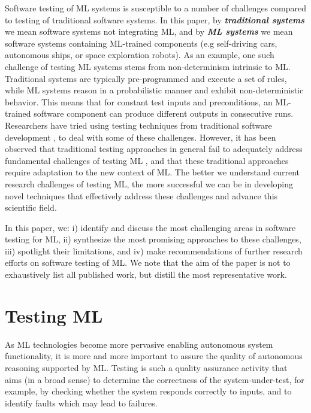 \documentclass[letterpaper]{article} %
\begin{document}
Software testing of ML systems is susceptible to a number of challenges compared to testing of traditional software systems. In this paper, by \textit{\textbf{traditional systems}} we mean software systems not integrating ML, and by \textit{\textbf{ML systems}} we mean software systems containing ML-trained components (e.g self-driving cars, autonomous ships, or space exploration robots). As an example, one such challenge of testing ML systems stems from non-determinism intrinsic to ML. Traditional systems are typically pre-programmed and execute a set of rules, while ML systems reason in a probabilistic manner and exhibit non-deterministic behavior. This means that for constant test inputs and preconditions, an ML-trained software component can produce different outputs in consecutive runs. Researchers have tried using testing techniques from traditional software development \cite{Hutchison2018}, to deal with some of these challenges. However, it has been observed that traditional testing approaches in general fail to adequately address fundamental challenges of testing ML \cite{Helle2016}, and that these traditional approaches require adaptation to the new context of ML. The better we understand current research challenges of testing ML, the more successful we can be in developing novel techniques that effectively address these challenges and advance this scientific field. 

In this paper, we: i) identify and discuss the most challenging areas in software testing for ML, ii) synthesize the most promising approaches to these challenges, iii) spotlight their limitations, and iv) make recommendations of further research efforts on software testing of ML. We note that the aim of the paper is not to exhaustively list all published work, but distill the most representative work. 

\section{Testing ML}
As ML technologies become more pervasive enabling autonomous system functionality, it is more and more important to assure the quality of autonomous reasoning supported by ML. Testing is such a quality assurance activity that aims (in a broad sense) to determine the correctness of the system-under-test, for example, by checking whether the system responds correctly to inputs, and to identify faults which may lead to failures. 
\end{document}
